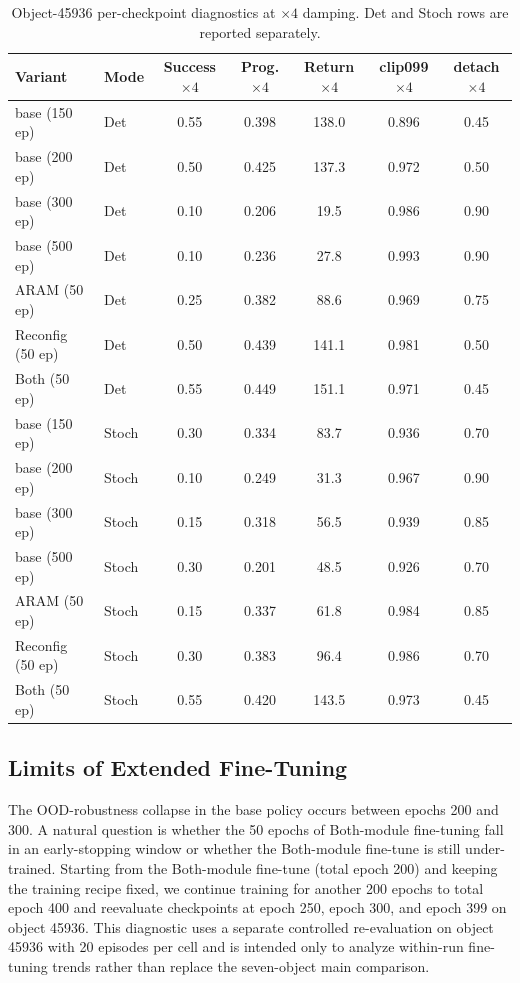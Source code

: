\documentclass{llmxive}
\begin{document}
\begin{table}[t]
\centering
\small
\begin{tabular}{llccccc}
\toprule
Variant & Mode & Success $\times4$ & Prog. $\times4$ & Return $\times4$
        & clip099 $\times4$ & detach $\times4$ \\
\midrule
base (150 ep)      & Det & 0.55 & 0.398 & 138.0 & 0.896 & 0.45 \\
base (200 ep)      & Det & 0.50 & 0.425 & 137.3 & 0.972 & 0.50 \\
base (300 ep)      & Det & 0.10 & 0.206 & 19.5  & 0.986 & 0.90 \\
base (500 ep)      & Det & 0.10 & 0.236 & 27.8  & 0.993 & 0.90 \\
ARAM (50 ep)      & Det & 0.25 & 0.382 & 88.6  & 0.969 & 0.75 \\
Reconfig (50 ep)  & Det & 0.50 & 0.439 & 141.1 & 0.981 & 0.50 \\
Both (50 ep)      & Det & 0.55 & 0.449 & 151.1 & 0.971 & 0.45 \\
\midrule
base (150 ep)      & Stoch & 0.30 & 0.334 & 83.7 & 0.936 & 0.70 \\
base (200 ep)      & Stoch & 0.10 & 0.249 & 31.3 & 0.967 & 0.90 \\
base (300 ep)      & Stoch & 0.15 & 0.318 & 56.5 & 0.939 & 0.85 \\
base (500 ep)      & Stoch & 0.30 & 0.201 & 48.5 & 0.926 & 0.70 \\
ARAM (50 ep)      & Stoch & 0.15 & 0.337 & 61.8 & 0.984 & 0.85 \\
Reconfig (50 ep)  & Stoch & 0.30 & 0.383 & 96.4 & 0.986 & 0.70 \\
Both (50 ep)      & Stoch & 0.55 & 0.420 & 143.5 & 0.973 & 0.45 \\
\bottomrule
\end{tabular}
\caption{Object-45936 per-checkpoint diagnostics at $\times4$ damping.
Det and Stoch rows are reported separately.}
\label{tab:ood}
\end{table}


\subsection{Limits of Extended Fine-Tuning}
\label{sec:contft}

The OOD-robustness collapse in the base policy occurs between epochs
200 and 300. A natural question is whether the 50 epochs of
Both-module fine-tuning fall in an early-stopping window or
whether the Both-module fine-tune is still under-trained. Starting from
the Both-module fine-tune (total epoch 200) and keeping the
training recipe fixed, we continue training for another 200 epochs to
total epoch 400 and reevaluate checkpoints at epoch 250,
epoch 300, and epoch 399 on object 45936. This diagnostic uses a
separate controlled re-evaluation on object 45936 with 20 episodes per
cell and is intended only to analyze within-run fine-tuning trends
rather than replace the seven-object main comparison.
\end{document}
